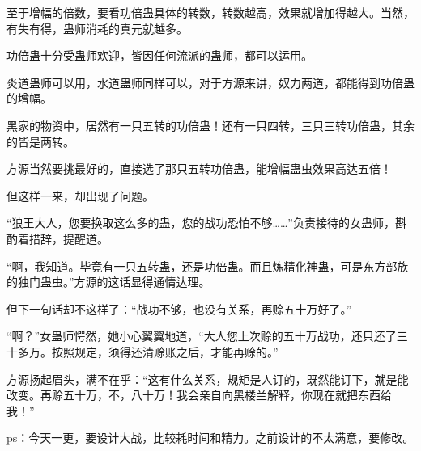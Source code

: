 \begin{this_body}
至于增幅的倍数，要看功倍蛊具体的转数，转数越高，效果就增加得越大。当然，有失有得，蛊师消耗的真元就越多。

功倍蛊十分受蛊师欢迎，皆因任何流派的蛊师，都可以运用。

炎道蛊师可以用，水道蛊师同样可以，对于方源来讲，奴力两道，都能得到功倍蛊的增幅。

黑家的物资中，居然有一只五转的功倍蛊！还有一只四转，三只三转功倍蛊，其余的皆是两转。

方源当然要挑最好的，直接选了那只五转功倍蛊，能增幅蛊虫效果高达五倍！

但这样一来，却出现了问题。

“狼王大人，您要换取这么多的蛊，您的战功恐怕不够……”负责接待的女蛊师，斟酌着措辞，提醒道。

“啊，我知道。毕竟有一只五转蛊，还是功倍蛊。而且炼精化神蛊，可是东方部族的独门蛊虫。”方源的这话显得通情达理。

但下一句话却不这样了：“战功不够，也没有关系，再赊五十万好了。”

“啊？”女蛊师愕然，她小心翼翼地道，“大人您上次赊的五十万战功，还只还了三十多万。按照规定，须得还清赊账之后，才能再赊的。”

方源扬起眉头，满不在乎：“这有什么关系，规矩是人订的，既然能订下，就是能改变。再赊五十万，不，八十万！我会亲自向黑楼兰解释，你现在就把东西给我！”

ps：今天一更，要设计大战，比较耗时间和精力。之前设计的不太满意，要修改。

\end{this_body}

